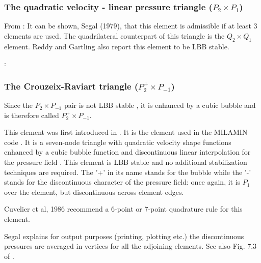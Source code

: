 \subsubsection{The quadratic velocity - linear pressure triangle ($P_2\times P_1$)}

From \cite{segal}: 
It can be shown, Segal (1979), that this element is admissible if at least 3 elements 
are used. The quadrilateral counterpart of this triangle is the $Q_2\times Q_1$ element.
Reddy and Gartling \cite[p179]{reddybook2} also report this element to be LBB stable.

\Literature: \cite{scan85,lejx14,cump20}


\subsubsection{The Crouzeix-Raviart triangle ($P_2^+\times P_{-1}$)}
\label{sec:crouzeix-raviart}

Since the $P_2\times P_{-1}$ pair is not LBB stable \cite[p179]{reddybook2}, 
it is enhanced by a cubic bubble and is therefore called $P_2^+\times P_{-1}$. 

This element was first introduced in \cite{crra73}.
It is the element used in the MILAMIN code \cite{daks08}.
It is a seven-node triangle with quadratic velocity shape 
functions enhanced by a cubic bubble function and discontinuous linear interpolation for 
the pressure field \cite{cuss86}. 
This element is LBB stable and no additional stabilization techniques are required\cite{elsw}.
The '+' in its name stands for the bubble while the '-' stands for the discontinuous
character of the pressure field: once again, it is $P_1$ over the element, but discontinuous
across element edges.

\begin{remark}
Cuvelier et al, 1986 \cite{cuss86} recommend a 6-point or 7-point quadrature rule for this element.
\end{remark}

\begin{remark}
Segal \cite{segal} explains 
for output purposes (printing, plotting etc.) the discontinuous pressures are averaged 
in vertices for all the adjoining elements. See also Fig. 7.3 of \cite{cuss86}.
\end{remark}

